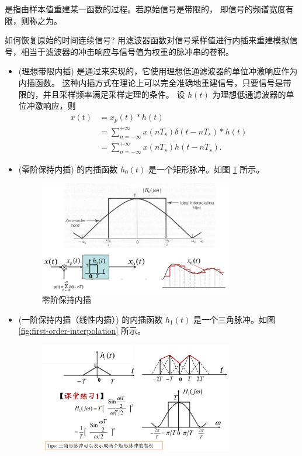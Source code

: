 \begin{definition}[内插]
    是指由样本值重建某一函数的过程。若原始信号是带限的，
    即信号的频谱宽度有限，则称之为。

    如何恢复原始的时间连续信号?
    用滤波器函数对信号采样值进行内插来重建模拟信号，相当于滤波器的冲击响应与信号值为权重的脉冲串的卷积。
    \begin{itemize}
        \item (理想带限内插)
            是通过来实现的，它使用理想低通滤波器的单位冲激响应作为内插函数。
            这种内插方式在理论上可以完全准确地重建信号，只要信号是带限的，并且采样频率满足采样定理的条件。
            设 $h(t)$ 为理想低通滤波器的单位冲激响应，则
            \begin{align*}
                x(t) & = x_p(t) * h(t) \\
                & = \sum_{n = -\infty}^{+\infty}x(nT_s)\delta(t - nT_s) * h(t) \\
                & = \sum_{n = -\infty}^{+\infty}x(nT_s)h(t - nT_s).
            \end{align*}
        \item (零阶保持内插)
            的内插函数 $h_0(t)$ 是一个矩形脉冲。如图 \ref{fig:zero-order-interpolation} 所示。
            \begin{figure}[H]
                \centering
                \includegraphics[width=0.8\textwidth]{chap2/img/zero-order-interpolation.png}
                \caption{零阶保持内插}
                \label{fig:zero-order-interpolation}
            \end{figure}
        \item (一阶保持内插（线性内插）)
            的内插函数 $h_1(t)$ 是一个三角脉冲。如图 \ref{fig:first-order-interpolation} 所示。
            \begin{figure}[H]
                \centering
                \includegraphics[width=0.8\textwidth]{chap2/img/first-order-interpolation.png}

\end{figure}
\end{itemize}
\end{definition}
